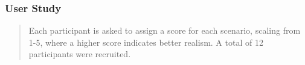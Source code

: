 \begin{frame}
    \frametitle{User Study}
    \begin{quote}
        Each participant is asked to assign a score for each scenario, 
        scaling from 1-5, where a higher score indicates better realism. 
        A total of 12 participants were recruited. 
    \end{quote}
\end{frame}